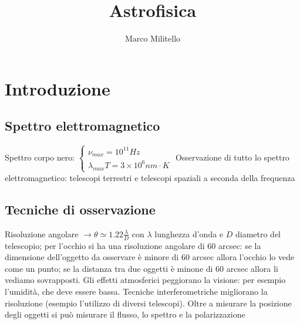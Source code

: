 \documentclass[a4paper,11pt]{report}
\theoremstyle{remark}
\theoremstyle{definition}
\begin{document}
	\date{}
	\author{Marco Militello}
	\title{Astrofisica}
	\maketitle
	\tableofcontents
	\newpage
	
\chapter{Introduzione}

\section*{Spettro elettromagnetico}
Spettro corpo nero: 
$\begin{cases}
    \nu_{max} = 10^{11} Hz \\
    \lambda_{max} T = 3 \times 10^6 nm \cdot K
\end{cases}$ \newline
Osservazione di tutto lo spettro elettromagnetico: telescopi terrestri e telescopi spaziali a seconda della frequenza

\section*{Tecniche di osservazione}
Risoluzione angolare $\rightarrow \theta \simeq 1.22 \frac{\lambda}{D}$ con $\lambda$ lunghezza d'onda e $D$ diametro del telescopio; per l'occhio si ha una risoluzione angolare di 60 arcsec: se la dimensione dell'oggetto da osservare è minore di 60 arcsec allora l'occhio lo vede come un punto; se la distanza tra due oggetti è minone di 60 arcsec allora li vediamo sovrapposti. \newline
Gli effetti atmosferici peggiorano la visione: per esempio l'umidità, che deve essere bassa. \newline
Tecniche interferometriche migliorano la risoluzione (esempio l'utilizzo di diversi telescopi). \newline
Oltre a misurare la posizione degli oggetti si può misurare il flusso, lo spettro e la polarizzazione
\end{document}
